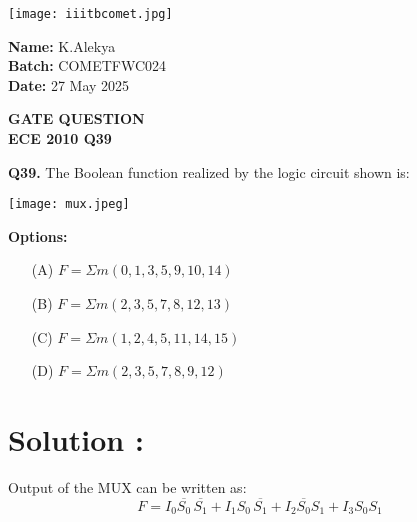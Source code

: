\documentclass{article}
\begin{document}
\begin{minipage}{0.6\textwidth}
    \texttt{[image: iiitbcomet.jpg]} %
\end{minipage}
\hfill
\begin{minipage}{0.35\textwidth}
\raggedleft
\textbf{Name:} K.Alekya \\
\textbf{Batch:} COMETFWC024 \\
\textbf{Date:} 27 May 2025
\end{minipage}

\begin{center}
    {\color{cyan} \LARGE \textbf{GATE QUESTION}}\\
    {\color{cyan} \Large \textbf{ECE 2010 Q39}}
\end{center}
\vspace{1em}
\noindent\textbf{\color{cyan} Q39.} The Boolean function realized by the logic circuit shown is:

\vspace{1em}

\begin{center}
    \texttt{[image: mux.jpeg]} %
\end{center}

\vspace{1em}

\noindent\textbf{Options:}

\vspace{0.5em}
\begin{multicols}{2}
\begin{itemize}
    \item[(A)] \(F = \Sigma m(0,1,3,5,9,10,14)\)
    \item[(B)] \(F = \Sigma m(2,3,5,7,8,12,13)\)
    \item[(C)] \(F = \Sigma m(1,2,4,5,11,14,15)\)
    \item[(D)] \(F = \Sigma m(2,3,5,7,8,9,12)\)
\end{itemize}
\end{multicols}


\section*{\color{cyan} Solution :}

Output of the MUX can be written as:
\[
F = I_0 \overline{S_0} \, \overline{S_1} + I_1 S_0 \, \overline{S_1} + I_2 \overline{S_0} S_1 + I_3 S_0 S_1
\]
\end{document}
